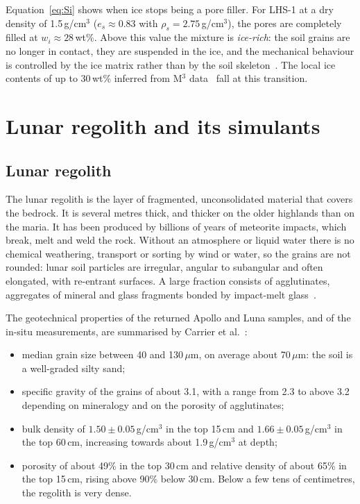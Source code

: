 Equation~\eqref{eq:Si} shows when ice stops being a pore filler. For LHS-1 at a dry density of 1.5\,g/cm$^3$ ($e_s\approx0.83$ with $\rho_s = 2.75$\,g/cm$^3$), the pores are completely filled at $w_i\approx28$\,wt\%. Above this value the mixture is \emph{ice-rich}: the soil grains are no longer in contact, they are suspended in the ice, and the mechanical behaviour is controlled by the ice matrix rather than by the soil skeleton~\cite{ting1983,arenson2007}. The local ice contents of up to 30\,wt\% inferred from M$^3$ data~\cite{li2018} fall at this transition.

\section{Lunar regolith and its simulants}
\label{sec:regolith}

\subsection{Lunar regolith}

The lunar regolith is the layer of fragmented, unconsolidated material that covers the bedrock. It is several metres thick, and thicker on the older highlands than on the maria. It has been produced by billions of years of meteorite impacts, which break, melt and weld the rock. Without an atmosphere or liquid water there is no chemical weathering, transport or sorting by wind or water, so the grains are not rounded: lunar soil particles are irregular, angular to subangular and often elongated, with re-entrant surfaces. A large fraction consists of agglutinates, aggregates of mineral and glass fragments bonded by impact-melt glass~\cite{carrier1991}.

The geotechnical properties of the returned Apollo and Luna samples, and of the in-situ measurements, are summarised by Carrier et al.~\cite{carrier1991}:
\begin{itemize}
    \item median grain size between 40 and 130\,$\mu$m, on average about 70\,$\mu$m: the soil is a well-graded silty sand;
    \item specific gravity of the grains of about 3.1, with a range from 2.3 to above 3.2 depending on mineralogy and on the porosity of agglutinates;
    \item bulk density of $1.50\pm0.05$\,g/cm$^3$ in the top 15\,cm and $1.66\pm0.05$\,g/cm$^3$ in the top 60\,cm, increasing towards about 1.9\,g/cm$^3$ at depth;
    \item porosity of about 49\% in the top 30\,cm and relative density of about 65\% in the top 15\,cm, rising above 90\% below 30\,cm. Below a few tens of centimetres, the regolith is very dense.
\end{itemize}

